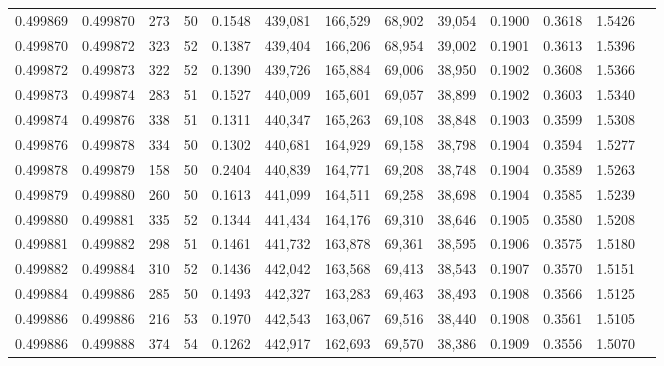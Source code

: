 \begin{tabular}{rrrrrrrrrrrrr}
0.499869 & 0.499870 & 273 &  50 &                                     0.1548 & 439,081 & 166,529 &  68,902 &  39,054 & 0.1900 & 0.3618 & 1.5426 \\
0.499870 & 0.499872 & 323 &  52 &                                     0.1387 & 439,404 & 166,206 &  68,954 &  39,002 & 0.1901 & 0.3613 & 1.5396 \\
0.499872 & 0.499873 & 322 &  52 &                                     0.1390 & 439,726 & 165,884 &  69,006 &  38,950 & 0.1902 & 0.3608 & 1.5366 \\
0.499873 & 0.499874 & 283 &  51 &                                     0.1527 & 440,009 & 165,601 &  69,057 &  38,899 & 0.1902 & 0.3603 & 1.5340 \\
0.499874 & 0.499876 & 338 &  51 &                                     0.1311 & 440,347 & 165,263 &  69,108 &  38,848 & 0.1903 & 0.3599 & 1.5308 \\
0.499876 & 0.499878 & 334 &  50 &                                     0.1302 & 440,681 & 164,929 &  69,158 &  38,798 & 0.1904 & 0.3594 & 1.5277 \\
0.499878 & 0.499879 & 158 &  50 &                                     0.2404 & 440,839 & 164,771 &  69,208 &  38,748 & 0.1904 & 0.3589 & 1.5263 \\
0.499879 & 0.499880 & 260 &  50 &                                     0.1613 & 441,099 & 164,511 &  69,258 &  38,698 & 0.1904 & 0.3585 & 1.5239 \\
0.499880 & 0.499881 & 335 &  52 &                                     0.1344 & 441,434 & 164,176 &  69,310 &  38,646 & 0.1905 & 0.3580 & 1.5208 \\
0.499881 & 0.499882 & 298 &  51 &                                     0.1461 & 441,732 & 163,878 &  69,361 &  38,595 & 0.1906 & 0.3575 & 1.5180 \\
0.499882 & 0.499884 & 310 &  52 &                                     0.1436 & 442,042 & 163,568 &  69,413 &  38,543 & 0.1907 & 0.3570 & 1.5151 \\
0.499884 & 0.499886 & 285 &  50 &                                     0.1493 & 442,327 & 163,283 &  69,463 &  38,493 & 0.1908 & 0.3566 & 1.5125 \\
0.499886 & 0.499886 & 216 &  53 &                                     0.1970 & 442,543 & 163,067 &  69,516 &  38,440 & 0.1908 & 0.3561 & 1.5105 \\
0.499886 & 0.499888 & 374 &  54 &                                     0.1262 & 442,917 & 162,693 &  69,570 &  38,386 & 0.1909 & 0.3556 & 1.5070 \\

\end{tabular}
